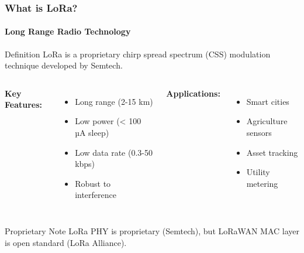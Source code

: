 \documentclass{beamer}
\begin{document}
\begin{frame}
\frametitle{What is LoRa?}
\framesubtitle{Long Range Radio Technology}

\begin{block}{Definition}
LoRa is a proprietary chirp spread spectrum (CSS) modulation technique developed by Semtech.
\end{block}

\begin{columns}[T]
\textbf{Key Features:}
\begin{itemize}
    \item Long range (2-15 km)
    \item Low power (< 100 µA sleep)
    \item Low data rate (0.3-50 kbps)
    \item Robust to interference
\end{itemize}

\textbf{Applications:}
\begin{itemize}
    \item Smart cities
    \item Agriculture sensors
    \item Asset tracking
    \item Utility metering
\end{itemize}
\end{columns}

\vspace{1em}
\begin{alertblock}{Proprietary Note}
LoRa PHY is proprietary (Semtech), but LoRaWAN MAC layer is open standard (LoRa Alliance).
\end{alertblock}
\end{frame}
\end{document}
